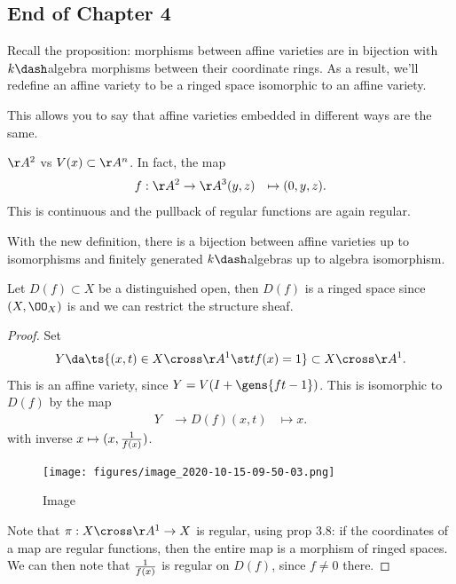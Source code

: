 \hypertarget{end-of-chapter-4}{%
\subsection{End of Chapter 4}\label{end-of-chapter-4}}

Recall the proposition: morphisms between affine varieties are in
bijection with \(k\dash\)algebra morphisms between their coordinate
rings. As a result, we'll redefine an affine variety to be a ringed
space isomorphic to an affine variety.

This allows you to say that affine varieties embedded in different ways
are the same.

\begin{example}

\(\AA^2\) vs \(V(x) \subset \AA^n\). In fact, the map
\begin{align*}  
f: \AA^2 &\to \AA^3
(y,z) &\mapsto (0, y, z)
.\end{align*} This is continuous and the pullback of regular functions
are again regular.

\end{example}

\begin{remark}

With the new definition, there is a bijection between affine varieties
up to isomorphisms and finitely generated \(k\dash\)algebras up to
algebra isomorphism.

\end{remark}

\begin{proposition}[?]

Let \(D(f) \subset X\) be a distinguished open, then \(D(f)\) is a
ringed space since \((X, \OO_X)\) is and we can restrict the structure
sheaf.

\end{proposition}

\begin{proof}

Set
\begin{align*}  
Y \da \ts{(x, t) \in X\cross \AA^1 \st tf(x) = 1} \subset X\cross \AA^1
.\end{align*} This is an affine variety, since
\(Y = V(I + \gens{ft-1})\). This is isomorphic to \(D(f)\) by the map
\begin{align*}  
Y &\to D(f)
(x, t) &\mapsto x
.\end{align*} with inverse \(x \mapsto (x, {1\over f(x)})\).

\begin{figure}
\centering
\texttt{[image: figures/image\_2020-10-15-09-50-03.png]}
\caption{Image}
\end{figure}

Note that \(\pi: X\cross \AA^1 \to X\) is regular, using prop 3.8: if
the coordinates of a map are regular functions, then the entire map is a
morphism of ringed spaces. We can then note that \(1\over f(x)\) is
regular on \(D(f)\), since \(f\neq 0\) there.

\end{proof}

